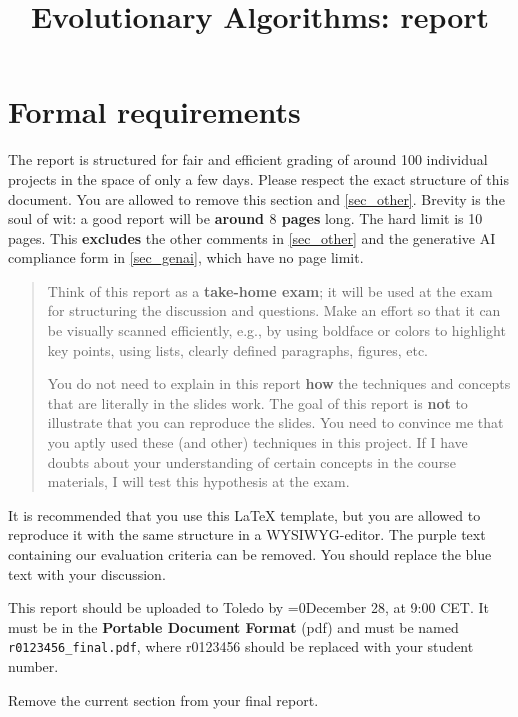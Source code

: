 \documentclass[a4paper,10pt]{article}
\title{\vspace{-2cm}Evolutionary Algorithms: \switch{Final}{Retake} report}
\author{\ReplaceMe{Lowie Van Vyve (r0843621)}}
\def\retake{0}
\newcommand{\switch}[2]{\ifnum\retake=0{#1}\else{#2}\fi}
\newcommand{\thisyear}{\the\year}
\newcommand{\deadlineCode}{\switch{December 28, \thisyear{} at 9:00 CET}{August 4, \thisyear{} at 9:00 CET}}
\newcommand{\deadlineReport}{\deadlineCode}
\newcommand{\RemoveMe}[1]{{\color{purple}#1}}
\begin{document}
\selectfont{}

\maketitle

\RemoveMe{
\section*{Formal requirements} \label{sec_this}

The report is structured for fair and efficient grading of around 100 individual projects in the space of only a few days. Please respect the exact structure of this document. You are allowed to remove this section and \cref{sec_other}. Brevity is the soul of wit: a good report will be \textbf{around $8$ pages} long. The hard limit is 10 pages. 
This \textbf{excludes} the other comments in \cref{sec_other} and the generative AI compliance form in \cref{sec_genai}, which have no page limit.

\begin{quote}
Think of this report as a \textbf{take-home exam}; it will be used at the exam for structuring the discussion and questions. Make an effort so that it can be visually scanned efficiently, e.g., by using boldface or colors to highlight key points, using lists, clearly defined paragraphs, figures, etc.

You do not need to explain in this report \textbf{how} the techniques and concepts that are literally in the slides work. The goal of this report is \textbf{not} to illustrate that you can reproduce the slides. You need to convince me that you aptly used these (and other) techniques in this project. If I have doubts about your understanding of certain concepts in the course materials, I will test this hypothesis at the exam.
\end{quote}

It is recommended that you use this \LaTeX{} template, but you are allowed to reproduce it with the same structure in a WYSIWYG-editor. The purple text containing our evaluation criteria can be removed. You should replace the blue text with your discussion.

This report should be uploaded to Toledo by \deadlineReport. It must be in the \textbf{Portable Document Format} (pdf) and must be named \texttt{r0123456\_final.pdf}, where r0123456 should be replaced with your student number.

Remove the current section from your final report.
}
\end{document}
